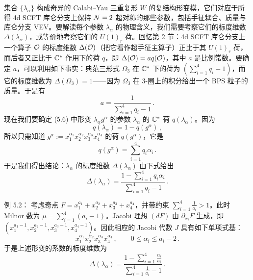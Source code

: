   集合 $\{\lambda_{\alpha}\}$ 构成奇异的 Calabi--Yau 三重复形 $W$ 的复结构形变模，它们对应于所得 4d SCFT 库仑分支上保持 $\mathcal{N}=2$ 超对称的那些参数，包括手征耦合、质量与库仑分支 VEV。要解读每个参数 $\lambda_{\alpha}$ 的物理含义，我们需要考察它们的标度维数 $\Delta(\lambda_{\alpha})$，或等价地考察它们的 $U(1)_r$ 荷。回忆第 2 节：4d SCFT 库仑分支上一个算子 $\mathcal{O}$ 的标度维数 $\Delta(\mathcal{O})$（把它看作超手征主算子）正比于其 $U(1)_r$ 荷，而后者又正比于 $\mathbb{C}^*$ 作用下的荷 $q$，即 $\Delta(\mathcal{O})=aq(\mathcal{O})$，其中 $a$ 是比例常数。要确定 $a$，可以利用如下事实：典范三形式 $\Omega_3$ 在 $\mathbb{C}^*$ 下的荷为 $(\sum_{i=1}^{4}q_i-1)$，而它的标度维数为 $\Delta(\Omega_3)=1$——因为 $\Omega_3$ 在 3-圈上的积分给出一个 BPS 粒子的质量。于是有
  \begin{equation}
    a = \frac{1}{\sum_{i=1}^{4}q_i-1}\,.
    \tag{5.11}
  \end{equation}
  现在我们要确定 (5.6) 中形变 $\lambda_{\alpha}g^{\alpha}$ 的参数 $\lambda_{\alpha}$ 的 $\mathbb{C}^*$ 荷 $q(\lambda_{\alpha})$。因为
  \begin{equation}
    q(\lambda_{\alpha}) = 1-q(g^{\alpha})\,,
    \tag{5.12}
  \end{equation}
  所以只需知道 $g^{\alpha}:=x_1^{\alpha_1}x_2^{\alpha_2}x_3^{\alpha_3}x_4^{\alpha_4}$ 的荷 $q(g^{\alpha})$，它是
  \begin{equation}
    q(g^{\alpha}) = \sum_{i=1}^{4}q_i\alpha_i\,.
    \tag{5.13}
  \end{equation}
  于是我们得出结论：$\lambda_{\alpha}$ 的标度维数 $\Delta(\lambda_{\alpha})$ 由下式给出
  \begin{equation}
    \Delta(\lambda_{\alpha}) = \frac{1-\sum_{i=1}^{4}q_i\alpha_i}{\sum_{i=1}^{4}q_i-1}\,.
    \tag{5.14}
  \end{equation}

\begin{examplebox}{例 5.2：}
  考虑奇点 $F=x_1^{a_1}+x_2^{a_2}+x_3^{a_3}+x_4^{a_4}$，并带约束 $\sum_{i=1}^{4}\frac{1}{a_i}>1$。此时 Milnor 数为 $\mu=\sum_{i=1}^{4}(a_i-1)$。Jacobi 理想 $(dF)$ 由 $\partial_{x_i}F$ 生成，即 $(x_1^{a_1-1},x_2^{a_2-1},x_3^{a_3-1},x_4^{a_4-1})$。因此相应的 Jacobi 代数 $J$ 具有如下单项式基：
  \begin{equation}
    x_1^{\alpha_1}x_2^{\alpha_2}x_3^{\alpha_3}x_4^{\alpha_4}\,,\qquad 0\leqslant\alpha_i\leqslant a_i-2\,.
    \tag{5.15}
  \end{equation}
  于是上述形变的系数的标度维数为
  \begin{equation}
    \Delta(\lambda_{\alpha}) = \frac{1-\sum_{i=1}^{4}\frac{\alpha_i}{a_i}}{\sum_{i=1}^{4}\frac{1}{a_i}-1}\,.
    \tag{5.16}
  \end{equation}
\end{examplebox}

